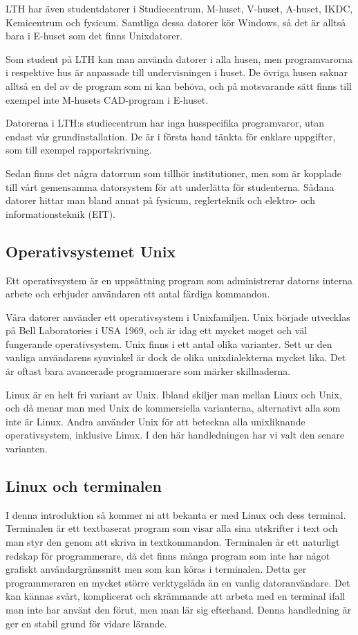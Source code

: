 \documentclass[a4paper,twocolumn]{book}
\begin{document}
LTH har även studentdatorer i Studiecentrum, M-huset, V-huset, A-huset, IKDC,
Kemicentrum och fysicum.
Samtliga dessa datorer kör Windows, så det är alltså bara i E-huset som det
finns Unixdatorer.

Som student på LTH kan man använda datorer i alla husen, men programvarorna i
respektive hus är anpassade till undervisningen i huset. De övriga husen
saknar alltså en del av de program som ni kan behöva, och på motsvarande sätt
finns till exempel inte M-husets CAD-program i E-huset.

Datorerna i LTH:s studiecentrum har inga husspecifika programvaror, utan
endast vår grundinstallation. De är i första hand tänkta för enklare
uppgifter, som till exempel rapportskrivning.

Sedan finns det några datorrum som tillhör institutioner, men som är kopplade
till vårt gemensamma datorsystem för att underlätta för studenterna. Sådana
datorer hittar man bland annat på fysicum, reglerteknik och elektro- och
informationsteknik (EIT).

\subsection{Operativsystemet Unix}

Ett operativsystem är en uppsättning program som administrerar datorns
interna arbete och erbjuder användaren ett antal färdiga kommandon.

Våra datorer använder ett operativsystem i Unixfamiljen. Unix
började utvecklas på Bell Laboratories i USA 1969, och är idag ett
mycket moget och väl fungerande operativsystem. Unix finns i ett antal
olika varianter. Sett ur den vanliga användarens synvinkel är dock de
olika unixdialekterna mycket lika. Det är oftast bara avancerade
programmerare som märker skillnaderna.

Linux är en helt fri variant av Unix. Ibland skiljer man mellan Linux och
Unix, och då menar man med Unix de kommersiella varianterna, alternativt alla
som inte är Linux. Andra använder Unix för att beteckna alla unixliknande
operativsystem, inklusive Linux. I den här handledningen har vi valt den
senare varianten.


\subsection{Linux och terminalen}

I denna introduktion så kommer ni att bekanta er med Linux och dess terminal.
Terminalen är ett textbaserat program som visar alla sina utskrifter i text
och man styr den genom att skriva in textkommandon. 
Terminalen är ett naturligt redskap för programmerare, då det finns många program
som inte har något grafiskt användargränssnitt men som kan köras i terminalen. Detta ger programmeraren en mycket större verktygslåda än en vanlig datoranvändare. 
Det kan kännas svårt, komplicerat och skrämmande att arbeta med en terminal ifall man inte har använt den förut, men man lär sig efterhand. Denna handledning är ger en stabil grund för vidare lärande.
\end{document}
